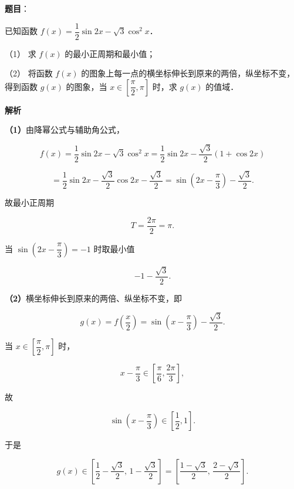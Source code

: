 \begin{answer}

\textbf{题目}：

已知函数 $f(x)=\dfrac{1}{2}\sin 2x-\sqrt{3}\cos^{2}x$．

（1） 求 $f(x)$ 的最小正周期和最小值；

（2） 将函数 $f(x)$ 的图象上每一点的横坐标伸长到原来的两倍，纵坐标不变，得到函数 $g(x)$ 的图象，当 $x\in\left[\dfrac{\pi}{2},\pi\right]$ 时，求 $g(x)$ 的值域．

\textbf{解析}

\textbf{（1）}由降幂公式与辅助角公式，

\nopagebreak[4]
\[
f(x)=\frac{1}{2}\sin 2x-\sqrt{3}\cos^{2}x
=\frac{1}{2}\sin 2x-\frac{\sqrt{3}}{2}(1+\cos 2x)
\]

\nopagebreak[4]
\[
=\frac{1}{2}\sin 2x-\frac{\sqrt{3}}{2}\cos 2x-\frac{\sqrt{3}}{2}
=\sin\left(2x-\frac{\pi}{3}\right)-\frac{\sqrt{3}}{2}.
\]

故最小正周期

\nopagebreak[4]
\[
T=\frac{2\pi}{2}=\pi.
\]

当 $\sin\left(2x-\dfrac{\pi}{3}\right)=-1$ 时取最小值

\nopagebreak[4]
\[
-1-\frac{\sqrt{3}}{2}.
\]

\textbf{（2）}横坐标伸长到原来的两倍、纵坐标不变，即

\nopagebreak[4]
\[
g(x)=f\left(\frac{x}{2}\right)
=\sin\left(x-\frac{\pi}{3}\right)-\frac{\sqrt{3}}{2}.
\]

当 $x\in\left[\dfrac{\pi}{2},\pi\right]$ 时，

\nopagebreak[4]
\[
x-\frac{\pi}{3}\in\left[\frac{\pi}{6},\frac{2\pi}{3}\right],
\]

故

\nopagebreak[4]
\[
\sin\left(x-\frac{\pi}{3}\right)\in\left[\frac{1}{2},1\right].
\]

于是

\nopagebreak[4]
\[
g(x)\in\left[\frac{1}{2}-\frac{\sqrt{3}}{2},\,1-\frac{\sqrt{3}}{2}\right]
=\left[\frac{1-\sqrt{3}}{2},\,\frac{2-\sqrt{3}}{2}\right].
\]



\end{answer}
